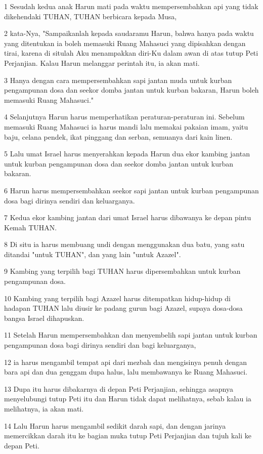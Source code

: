 \par 1 Sesudah kedua anak Harun mati pada waktu mempersembahkan api yang tidak dikehendaki TUHAN, TUHAN berbicara kepada Musa,
\par 2 kata-Nya, "Sampaikanlah kepada saudaramu Harun, bahwa hanya pada waktu yang ditentukan ia boleh memasuki Ruang Mahasuci yang dipisahkan dengan tirai, karena di situlah Aku menampakkan diri-Ku dalam awan di atas tutup Peti Perjanjian. Kalau Harun melanggar perintah itu, ia akan mati.
\par 3 Hanya dengan cara mempersembahkan sapi jantan muda untuk kurban pengampunan dosa dan seekor domba jantan untuk kurban bakaran, Harun boleh memasuki Ruang Mahasuci."
\par 4 Selanjutnya Harun harus memperhatikan peraturan-peraturan ini. Sebelum memasuki Ruang Mahasuci ia harus mandi lalu memakai pakaian imam, yaitu baju, celana pendek, ikat pinggang dan serban, semuanya dari kain linen.
\par 5 Lalu umat Israel harus menyerahkan kepada Harun dua ekor kambing jantan untuk kurban pengampunan dosa dan seekor domba jantan untuk kurban bakaran.
\par 6 Harun harus mempersembahkan seekor sapi jantan untuk kurban pengampunan dosa bagi dirinya sendiri dan keluarganya.
\par 7 Kedua ekor kambing jantan dari umat Israel harus dibawanya ke depan pintu Kemah TUHAN.
\par 8 Di situ ia harus membuang undi dengan menggunakan dua batu, yang satu ditandai "untuk TUHAN", dan yang lain "untuk Azazel".
\par 9 Kambing yang terpilih bagi TUHAN harus dipersembahkan untuk kurban pengampunan dosa.
\par 10 Kambing yang terpilih bagi Azazel harus ditempatkan hidup-hidup di hadapan TUHAN lalu diusir ke padang gurun bagi Azazel, supaya dosa-dosa bangsa Israel dihapuskan.
\par 11 Setelah Harun mempersembahkan dan menyembelih sapi jantan untuk kurban pengampunan dosa bagi dirinya sendiri dan bagi keluarganya,
\par 12 ia harus mengambil tempat api dari mezbah dan mengisinya penuh dengan bara api dan dua genggam dupa halus, lalu membawanya ke Ruang Mahasuci.
\par 13 Dupa itu harus dibakarnya di depan Peti Perjanjian, sehingga asapnya menyelubungi tutup Peti itu dan Harun tidak dapat melihatnya, sebab kalau ia melihatnya, ia akan mati.
\par 14 Lalu Harun harus mengambil sedikit darah sapi, dan dengan jarinya memercikkan darah itu ke bagian muka tutup Peti Perjanjian dan tujuh kali ke depan Peti.
